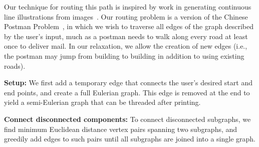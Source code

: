 Our technique for routing this path is inspired by work in generating continuous line illustrations from images~\cite{Bosch-tsp,Wong-continuousline}.  Our routing problem is a version of the Chinese Postman Problem~\cite{CPP}, in which we wish to traverse all edges of the graph described by the user's input, much as a postman needs to walk along every road at least once to deliver mail.  In our relaxation, we allow the creation of new edges (i.e., the postman may jump from building to building in addition to using existing roads).
%

{\bf Setup:} We first add a temporary edge that connects the user's desired start and end points, and create a full Eulerian graph.  This edge is removed at the end to yield a semi-Eulerian graph that can be threaded after printing.

{\bf Connect disconnected components:} To connect disconnected subgraphs, we find minimum Euclidean distance vertex pairs spanning two subgraphs, and greedily add edges to such pairs until all subgraphs are joined into a single graph.

